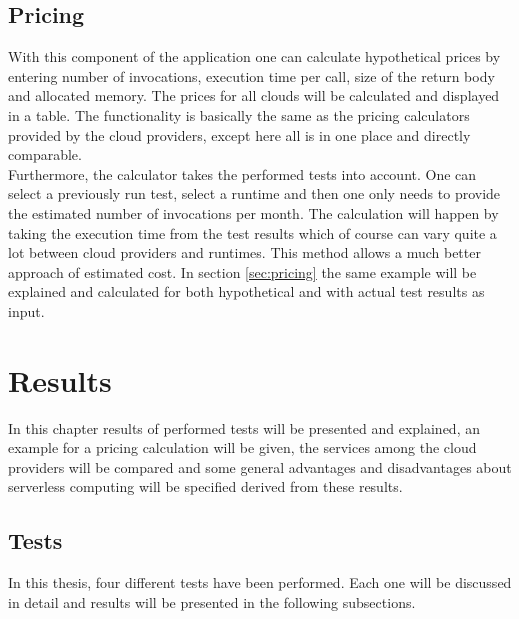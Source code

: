 \section{Pricing}
With this component of the application one can calculate hypothetical prices by entering number of invocations, execution time per call, size of the return body and allocated memory. The prices for all clouds will be calculated and displayed in a table. The functionality is basically the same as the pricing calculators provided by the cloud providers, except here all is in one place and directly comparable.\\
Furthermore, the calculator takes the performed tests into account. One can select a previously run test, select a runtime and then one only needs to provide the estimated number of invocations per month. The calculation will happen by taking the execution time from the test results which of course can vary quite a lot between cloud providers and runtimes. This method allows a much better approach of estimated cost. In section \ref{sec:pricing} the same example will be explained and calculated for both hypothetical and with actual test results as input.


\chapter{Results}
In this chapter results of performed tests will be presented and explained, an example for a pricing calculation will be given, the services among the cloud providers will be compared and some general advantages and disadvantages about serverless computing will be specified derived from these results.
\section{Tests}
In this thesis, four different tests have been performed. Each one will be discussed in detail and results will be presented in the following subsections.
